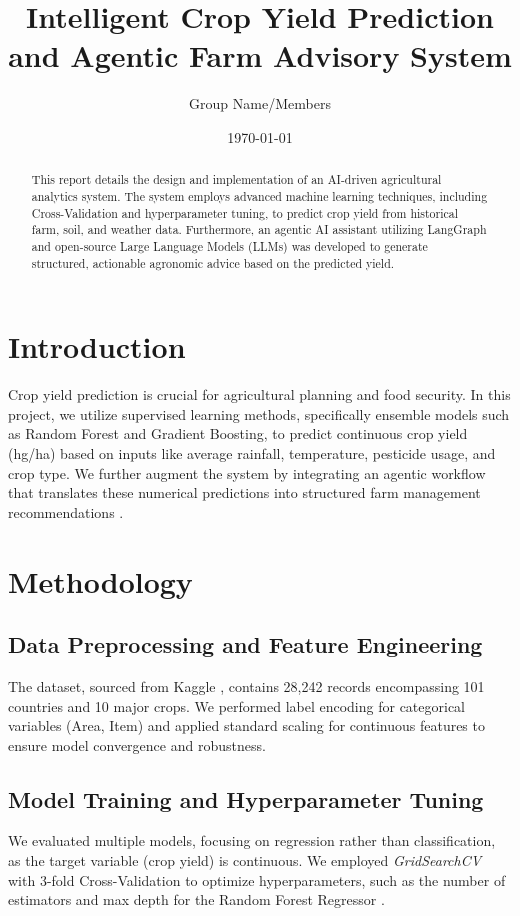 \documentclass[12pt,a4paper]{article}
\title{\textbf{Intelligent Crop Yield Prediction and Agentic Farm Advisory System}}
\author{Group Name/Members}
\date{\today}
\begin{document}
\maketitle

\begin{abstract}
This report details the design and implementation of an AI-driven agricultural analytics system. The system employs advanced machine learning techniques, including Cross-Validation and hyperparameter tuning, to predict crop yield from historical farm, soil, and weather data. Furthermore, an agentic AI assistant utilizing LangGraph and open-source Large Language Models (LLMs) was developed to generate structured, actionable agronomic advice based on the predicted yield.
\end{abstract}

\section{Introduction}
Crop yield prediction is crucial for agricultural planning and food security. In this project, we utilize supervised learning methods, specifically ensemble models such as Random Forest and Gradient Boosting, to predict continuous crop yield (hg/ha) based on inputs like average rainfall, temperature, pesticide usage, and crop type. We further augment the system by integrating an agentic workflow that translates these numerical predictions into structured farm management recommendations \cite{langgraph_docs}.

\section{Methodology}

\subsection{Data Preprocessing and Feature Engineering}
The dataset, sourced from Kaggle \cite{kaggle_dataset}, contains 28,242 records encompassing 101 countries and 10 major crops. We performed label encoding for categorical variables (Area, Item) and applied standard scaling for continuous features to ensure model convergence and robustness.

\subsection{Model Training and Hyperparameter Tuning}
We evaluated multiple models, focusing on regression rather than classification, as the target variable (crop yield) is continuous. We employed \textit{GridSearchCV} with 3-fold Cross-Validation to optimize hyperparameters, such as the number of estimators and max depth for the Random Forest Regressor \cite{scikit_learn}.
\end{document}
